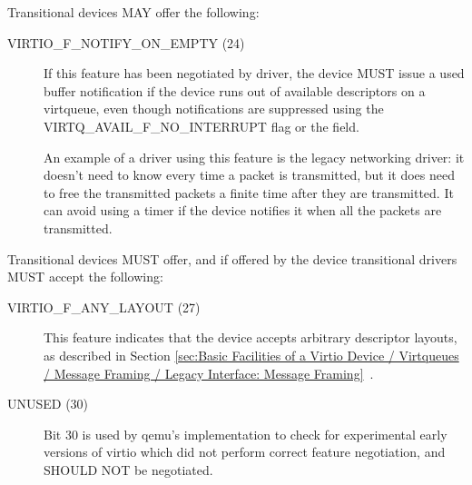 Transitional devices MAY offer the following:
\begin{description}
\item[VIRTIO_F_NOTIFY_ON_EMPTY (24)] If this feature
  has been negotiated by driver, the device MUST issue
  a used buffer notification if the device runs
  out of available descriptors on a virtqueue, even though
  notifications are suppressed using the VIRTQ_AVAIL_F_NO_INTERRUPT
  flag or the  field.
\begin{note}
  An example of a driver using this feature is the legacy
  networking driver: it doesn't need to know every time a packet
  is transmitted, but it does need to free the transmitted
  packets a finite time after they are transmitted. It can avoid
  using a timer if the device notifies it when all the packets
  are transmitted.
\end{note}
\end{description}

Transitional devices MUST offer, and if offered by the device
transitional drivers MUST accept the following:
\begin{description}
\item[VIRTIO_F_ANY_LAYOUT (27)] This feature indicates that the device
  accepts arbitrary descriptor layouts, as described in Section
  \ref{sec:Basic Facilities of a Virtio Device / Virtqueues / Message Framing / Legacy Interface: Message Framing}~.

\item[UNUSED (30)] Bit 30 is used by qemu's implementation to check
  for experimental early versions of virtio which did not perform
  correct feature negotiation, and SHOULD NOT be negotiated.
\end{description}
